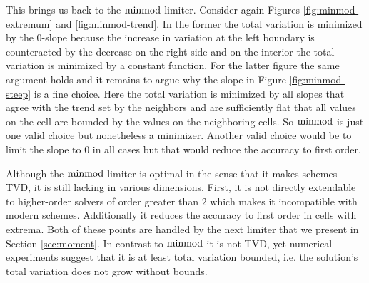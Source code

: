 This brings us back to the $\operatorname{minmod}$ limiter.
Consider again Figures \ref{fig:minmod-extremum} and \ref{fig:minmod-trend}.
In the former the total variation is minimized by the $0$-slope because the increase in variation at the left boundary is counteracted by the decrease on the right side and on the interior the total variation is minimized by a constant function.
For the latter figure the same argument holds and it remains to argue why the slope in Figure \ref{fig:minmod-steep} is a fine choice.
Here the total variation is minimized by all slopes that agree with the trend set by the neighbors and are sufficiently flat that all values on the cell are bounded by the values on the neighboring cells.
So $\operatorname{minmod}$ is just one valid choice but nonetheless a minimizer.
Another valid choice would be to limit the slope to $0$ in all cases but that would reduce the accuracy to first order.

Although the $\operatorname{minmod}$ limiter is optimal in the sense that it makes schemes TVD, it is still lacking in various dimensions.
First, it is not directly extendable to higher-order solvers of order greater than $2$ which makes it incompatible with modern schemes.
Additionally it reduces the accuracy to first order in cells with extrema.
Both of these points are handled by the next limiter that we present in Section \ref{sec:moment}.
In contrast to $\operatorname{minmod}$ it is not TVD, yet numerical experiments suggest that it is at least total variation bounded, i.e. the solution's total variation does not grow without bounds.
